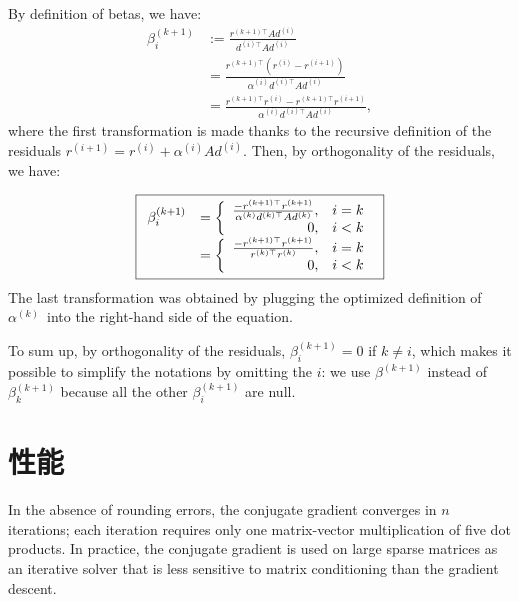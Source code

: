 \documentclass[notitlepage,oneside]{book}
\begin{document}
\begin{itemize}
By definition of betas, we have:
\begin{align*}
  \beta^{(k+1)}_i&:= \frac{r^{(k+1)\top}Ad^{(i)}  }{d^{(i)\top}Ad^{(i)}} \\
&= \frac{r^{(k+1)\top}(r^{(i)}- r^{(i+1)})  }{\alpha^{(i)} d^{(i)\top}Ad^{(i)}} \\
  &= \frac{r^{(k+1)\top}r^{(i)}- r^{(k+1)\top}r^{(i+1)}}{\alpha^{(i)} d^{(i)\top}Ad^{(i)}},
\end{align*}
where the first transformation is made thanks to the recursive definition of the residuals $r^{(i+1)}= r^{(i)}+\alpha^{(i)} A d^{(i)}$.
Then, by orthogonality of the residuals, we have:

\begin{equation}
\nonumber
\boxed{
\begin{array}{rcl}
\beta^{(k+1)}_i &= \left \{ \begin{array}{r l} \frac{- r^{(k+1)\top}r^{(k+1)}}{\alpha^{(k)} d^{(k)\top}Ad^{(k)}}, & i=k\\ 0, & i<k \end{array} \right. \\
                &= \left \{ \begin{array}{r l} \frac{- r^{(k+1)\top}r^{(k+1)}}{r^{(k)\top}r^{(k)}}, & i=k\\ 0, & i<k \end{array} \right. 
\end{array}
}
\end{equation}
The last transformation was obtained by plugging the optimized definition of $\alpha^{(k)}$ into the right-hand side of the equation.

To sum up, by orthogonality of the residuals, $\beta^{(k+1)}_i=0$ if $k\neq i$, which makes it possible to simplify the notations by omitting the $i$:
we use $\beta^{(k+1)}$ instead of $\beta_k^{(k+1)}$ because all the other $\beta_i^{(k+1)}$ are null.

\end{itemize}


\newpage
\section{性能}

In the absence of rounding errors, the conjugate gradient converges in $n$ iterations; each iteration requires only one matrix-vector multiplication of five dot products.
In practice, the conjugate gradient is used on large sparse matrices as an iterative solver that is less sensitive to matrix conditioning than the gradient descent.
\end{document}
